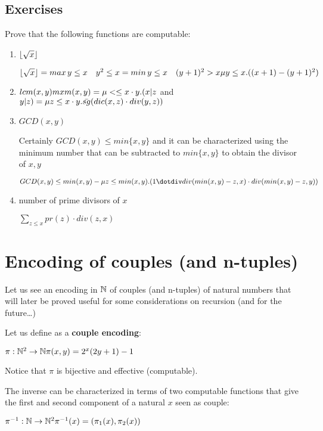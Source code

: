 \subsection{Exercises}
Prove that the following functions are computable:

\begin{enumerate}[label=\alph*)]
\item $\lfloor\sqrt{x}\rfloor$

  $\lfloor\sqrt{x}\rfloor = max\, y\leq x \quad y^2 \leq x\\
  = min \, y \leq x \quad (y+1)^2 > x\\
  \mu y\leq x. ((x+1)-(y+1)^2)$
\item $lcm(x,y)\\
  mxm(x,y) = \mu < \leq x\cdot y . (x|z $ and $ y|z)\\
  = \mu z \leq x\cdot y. \bar{sg}(dic(x,z)\cdot div(y,z))$
\item $GCD(x,y)$

  Certainly $GCD(x,y)\leq min\{x,y\}$ and it can be characterized using the minimum number that can be subtracted to $min\{x,y\}$ to obtain the divisor of $x,y$

  $GCD(x,y)\leq min(x,y)-\mu z\leq min(x,y).(1\dotdiv div(min(x,y)-z,x)\cdot div(min(x,y)-z, y))$
\item number of prime divisors of $x$

  $\sum_{z\leq x} pr(z)\cdot div(z,x)$
\end{enumerate}

\section{Encoding of couples (and n-tuples)}

Let us see an encoding in $\mathbb{N}$ of couples (and n-tuples) of natural numbers that will later be proved useful for some considerations on recursion (and for the future\dots)

Let us define as a \textbf{couple encoding}:

$\pi: \mathbb{N}^2\rightarrow\mathbb{N}\\
\\
\pi(x,y) = 2^x(2y+1)-1$

Notice that $\pi$ is bijective and effective (computable).

The inverse can be characterized in terms of two computable functions that give the first and second component of a natural $x$ seen as couple:

$\pi^{-1}:\mathbb{N}\rightarrow\mathbb{N}^2\\
\\
\pi^{-1}(x) = (\pi_1(x),\pi_2(x))$

